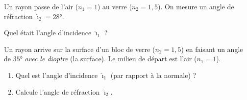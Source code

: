 \documentclass[11pt,a4paper]{article}
\begin{document}
\begin{exo}
Un rayon passe de l'air ($n_1=1$) au verre ($n_2=1{,}5$). On mesure un angle de réfraction
$\hat{\imath}_2=\ang{28}$.

Quel était l'angle d'incidence $\hat{\imath}_1$ ?
\end{exo}

\begin{exo}
Un rayon arrive sur la surface d'un bloc de verre ($n_2=1{,}5$) en faisant un angle de $\ang{35}$
\emph{avec le dioptre} (la surface). Le milieu de départ est l'air ($n_1=1$).
\begin{enumerate}[label=\alph*)]
  \item Quel est l'angle d'incidence $\hat{\imath}_1$ (par rapport à la normale) ?
  \item Calcule l'angle de réfraction $\hat{\imath}_2$.
\end{enumerate}
\end{exo}
\end{document}
